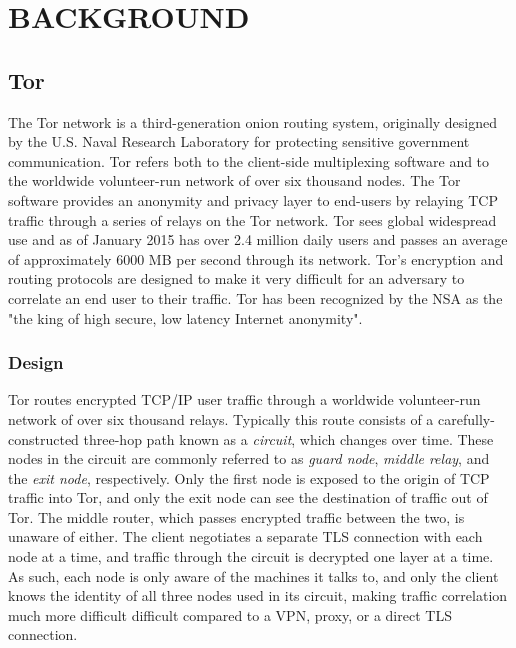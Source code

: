 
\chapter{BACKGROUND}

\section{Tor}

The Tor network is a third-generation onion routing system, originally designed by the U.S. Naval Research Laboratory for protecting sensitive government communication. Tor refers both to the client-side multiplexing software and to the worldwide volunteer-run network of over six thousand nodes. The Tor software provides an anonymity and privacy layer to end-users by relaying TCP traffic through a series of relays on the Tor network. Tor sees global widespread use and as of January 2015 has over 2.4 million daily users and passes an average of approximately 6000 MB per second through its network.\cite{TorMetrics} Tor's encryption and routing protocols are designed to make it very difficult for an adversary to correlate an end user to their traffic. Tor has been recognized by the NSA as the "the king of high secure, low latency Internet anonymity".\cite{TorSlidesNSA}

\subsection{Design}

Tor routes encrypted TCP/IP user traffic through a worldwide volunteer-run network of over six thousand relays. Typically this route consists of a carefully-constructed three-hop path known as a \textit{circuit}, which changes over time. These nodes in the circuit are commonly referred to as \textit{guard node}, \textit{middle relay}, and the \textit{exit node}, respectively. Only the first node is exposed to the origin of TCP traffic into Tor, and only the exit node can see the destination of traffic out of Tor. The middle router, which passes encrypted traffic between the two, is unaware of either. The client negotiates a separate TLS connection with each node at a time, and traffic through the circuit is decrypted one layer at a time. As such, each node is only aware of the machines it talks to, and only the client knows the identity of all three nodes used in its circuit, making traffic correlation much more difficult difficult compared to a VPN, proxy, or a direct TLS connection.

